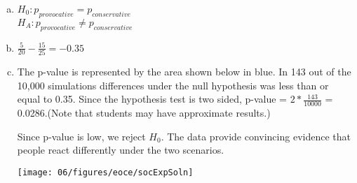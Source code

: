 {{}
{
\begin{enumerate}[(a)]
\setlength{\itemsep}{0mm}
\item $H_0: p_{provocative} = p_{conservative}$ \\
$H_A: p_{provocative} \ne p_{conservative}$
\item $\frac{5}{20} - \frac{15}{25} = -0.35$
\item The p-value is represented by the area shown below in blue. In 143 out of the 10,000 simulations differences under the null hypothesis was less than or equal to 0.35. Since the hypothesis test is two sided, p-value = $2 * \frac{143}{10000}$ = 0.0286.(Note that students may have approximate results.)
\noindent \begin{minipage}[c]{0.5\textwidth}
Since p-value is low, we reject $H_0$. The data provide convincing evidence that people react differently under the two scenarios.
\end{minipage}
\begin{minipage}[c]{0.5\textwidth}
\begin{center}
\texttt{[image: 06/figures/eoce/socExpSoln]}
\end{center}
\end{minipage}
\end{enumerate}
}
}

%




%
%	
